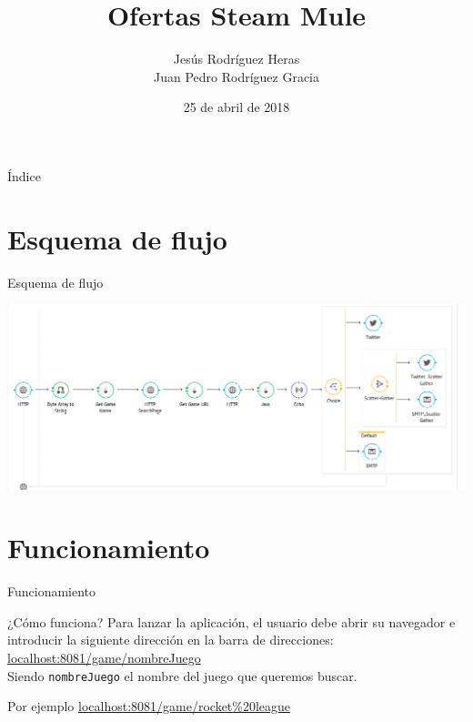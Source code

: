 \documentclass{beamer}
\title{Ofertas Steam Mule}
\author{Jesús Rodríguez Heras \\ Juan Pedro Rodríguez Gracia}
\date{25 de abril de 2018}
\begin{document}
\begin{frame}
  \titlepage
  
\end{frame}

\begin{frame}{Índice}
  \tableofcontents
\end{frame}


\section{Esquema de flujo}
\begin{frame}{Esquema de flujo}
	\begin{center}
		\includegraphics[scale=0.45]{diagrama2.png}
	\end{center}
\end{frame}

\section{Funcionamiento}
\begin{frame}{Funcionamiento}
	\begin{block}{¿Cómo funciona?}
		Para lanzar la aplicación, el usuario debe abrir su navegador e introducir la siguiente dirección en la barra de direcciones:\\
		\url{localhost:8081/game/nombreJuego}\\
		Siendo \texttt{nombreJuego} el nombre del juego que queremos buscar.
	\end{block}
	\begin{exampleblock}{Por ejemplo}
		\url{localhost:8081/game/rocket\%20league}
	\end{exampleblock}
\end{frame}
\end{document}
